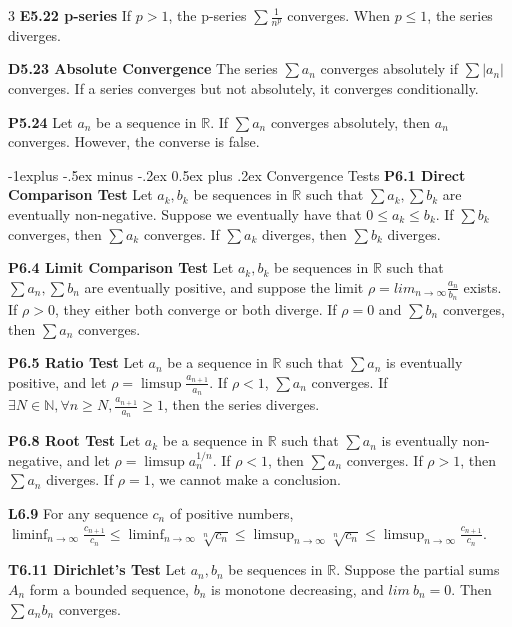 \documentclass[10pt, landscape]{article}
\makeatletter
\renewcommand{\section}{\@startsection{section}{1}{0mm}%
                                {-1ex plus -.5ex minus -.2ex}%
                                {0.5ex plus .2ex}%
                                {\normalfont\large\bfseries}}
\renewcommand{\section}{\@startsection{section}{2}{0mm}%
                                {-1explus -.5ex minus -.2ex}%
                                {0.5ex plus .2ex}%
                                {\normalfont\normalsize\bfseries}}
\makeatother
\begin{document}
\begin{multicols*}{3}
\textbf{E5.22 p-series} If $p>1$, the p-series $\sum \frac{1}{n^p}$ converges. When $p \leq 1$, the series diverges.

\textbf{D5.23 Absolute Convergence} The series $\sum a_n$ converges absolutely if $\sum |a_n|$ converges. If a series converges but not absolutely, it converges conditionally.

\textbf{P5.24} Let $a_n$ be a sequence in $\mathbb{R}$. If $\sum a_n$ converges absolutely, then $a_n$ converges. However, the converse is false.

\section{Convergence Tests}
\textbf{P6.1 Direct Comparison Test} Let $a_k, b_k$ be sequences in $\mathbb{R}$ such that $\sum a_k, \sum b_k$ are eventually non-negative. Suppose we eventually have that $0 \leq a_k \leq b_k$. If $\sum b_k$ converges, then $\sum a_k$ converges. If $\sum a_k$ diverges, then $\sum b_k$ diverges.

\textbf{P6.4 Limit Comparison Test} Let $a_k, b_k$ be sequences in $\mathbb{R}$ such that $\sum a_n, \sum b_n$ are eventually positive, and suppose the limit $\rho=lim_{n \rightarrow \infty}\frac{a_n}{b_n}$ exists. If $\rho > 0$, they either both converge or both diverge. If $\rho = 0$ and $\sum b_n$ converges, then $\sum a_n$ converges.

\textbf{P6.5 Ratio Test} Let $a_n$ be a sequence in $\mathbb{R}$ such that $\sum a_n$ is eventually positive, and let $\rho=\limsup \frac{a_{n+1}}{a_n}$. If $\rho<1$, $\sum a_n$ converges. If $\exists N \in \mathbb{N}, \forall n \geq N, \frac{a_{n+1}}{a_n}\geq 1$, then the series diverges.

\textbf{P6.8 Root Test} Let $a_k$ be a sequence in $\mathbb{R}$ such that $\sum a_n$ is eventually non-negative, and let $\rho=\limsup a_n^{1/n}$. If $\rho < 1$, then $\sum a_n$ converges. If $\rho > 1$, then $\sum a_n$ diverges. If $\rho=1$, we cannot make a conclusion.

\textbf{L6.9} For any sequence $c_n$ of positive numbers, $\liminf_{n \rightarrow \infty}\frac{c_{n+1}}{c_n}\leq \liminf_{n \rightarrow \infty}\sqrt[n]{c_n} \leq \limsup_{n \rightarrow\infty} \sqrt[n]{c_n}\leq \limsup_{n \rightarrow \infty}\frac{c_{n+1}}{c_n}$.

\textbf{T6.11 Dirichlet's Test} Let $a_n, b_n$ be sequences in $\mathbb{R}$. Suppose the partial sums $A_n$ form a bounded sequence, $b_n$ is monotone decreasing, and $lim\ b_n=0$. Then $\sum a_nb_n$ converges.


\end{multicols*}
\end{document}
